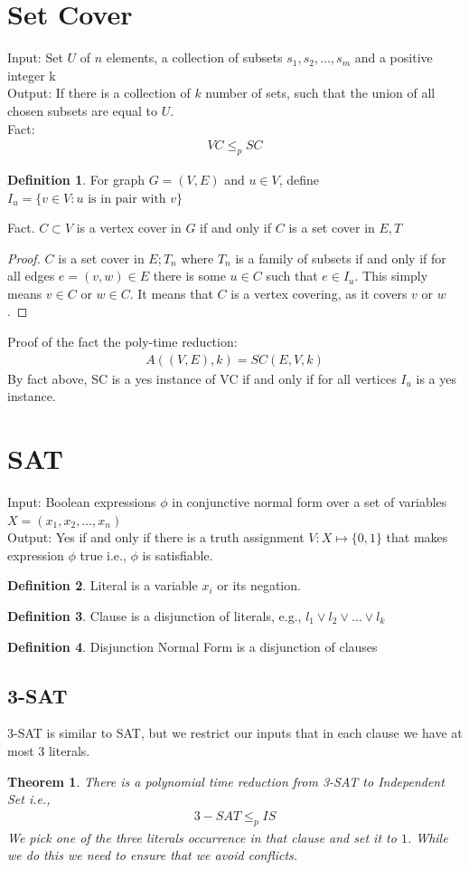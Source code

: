 \documentclass[a4paper]{article}
\theoremstyle{plain}
\newtheorem{thm}{Theorem}[section]
\theoremstyle{definition}
\newtheorem{defn}{Definition}[section]
\theoremstyle{remark}
\begin{document}
	\section{Set Cover}
	Input: Set $U$ of $n$ elements, a collection of subsets $s_1,s_2,\ldots,s_m$ and a positive integer k\\
	Output: If there is a collection of $k$ number of sets, such that the union of all chosen subsets are equal to $U$. \\
	Fact:
	\begin{align*}
		VC \le_p SC
	\end{align*}
	\begin{defn}
		For graph $G = (V,E)$ and $u \in V$, define $I_u = \{v \in V : u \text{ is in pair with } v\}$
	\end{defn}
	Fact. $C \subset V$ is a vertex cover in $G$ if and only if $C$ is a set cover in $E, T$ 
	\begin{proof}
	$C$ is a set cover in $E;T_n$ where $T_n$ is a family of subsets if and only if for all edges $e=(v,w)\in E$ there is some $u\in C$ such that $e \in I_u$. This simply means $v \in C$ or $w \in C$. It means that $C$ is a vertex covering, as it covers $v$ or $w$.
	\end{proof}
	Proof of the fact the poly-time reduction:
	\begin{align*}
		A((V,E),k) = SC(E,V,k)
	\end{align*}
	By fact above, SC is a yes instance of VC if and only if for all vertices $I_u$ is a yes instance.
	\section{SAT}
	Input: Boolean expressions $\phi$ in conjunctive normal form over a set of variables $X=(x_1,x_2,\ldots,x_n)$\\
	Output: Yes if and only if there is a truth assignment $V : X \mapsto \{0,1\}$ that makes expression $\phi$ true i.e., $\phi$ is satisfiable. 
	\begin{defn}
		Literal is a variable $x_i$ or its negation.
	\end{defn}
	\begin{defn}
		Clause is a disjunction of literals, e.g., $l_1 \lor l_2 \lor \ldots \lor l_k$
	\end{defn}
	\begin{defn}
		Disjunction Normal Form is a disjunction of clauses
	\end{defn}
	\subsection{3-SAT}
	3-SAT is similar to SAT, but we restrict our inputs that in each clause we have at most $3$ literals.
	\begin{thm}
		There is a polynomial time reduction from 3-SAT to Independent Set i.e.,
		\begin{align*}
			3-SAT \le_p IS
		\end{align*}
		We pick one of the three literals occurrence in that clause and set it to $1$. While we do this we need to ensure that we avoid conflicts. 
	\end{thm}
\end{document}
